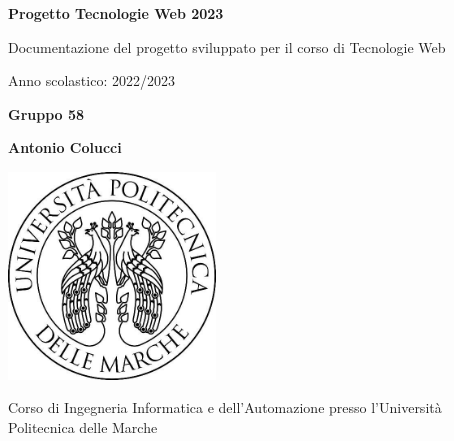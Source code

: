 \documentclass[12pt,a4paperS]{report}
\begin{document}
	\begin{titlepage}
		\begin{center}
			
			\Large
			\textbf{Progetto Tecnologie Web 2023}
			
			\vspace{0.5cm}
			
			Documentazione del progetto sviluppato per il corso di Tecnologie Web
			
			\vspace{0.5cm}
			
			Anno scolastico: 2022/2023
			
			\vspace{1.5cm}
			
			\textbf{Gruppo 58}
			\vspace{0.5cm}
			
			\textbf{Antonio Colucci}
			
			\vspace{2.5cm}
			
			\includegraphics[width=5.5cm]{logo_uni}
			
			\vspace{1.5cm}
			
			\Large
			Corso di Ingegneria Informatica e dell'Automazione presso l'Università Politecnica delle Marche
		\end{center}
	\end{titlepage}
	\tableofcontents
	\newpage
	
\end{document}
